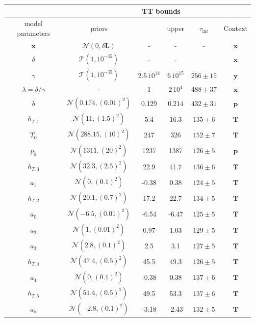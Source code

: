 \begin{table}
	\centering
	\begin{tabular}{ |c||c|c|c|c|c|   }
		\hline
		& &\multicolumn{2}{|c|}{TT bounds}& &\\
		\hline
		model parameters& priors&\makecell{lower}& \makecell{upper\\
		}&$\tau_{\text{int}}$&Context\\
		\hhline{|=||=|=|=|=|=|}
		$\bm{x}$ &$\mathcal{N}(0,\delta \bm{L})$ & -&-&-& $\bm{x}$\\ \hline
		$\delta$ &$\mathcal{T}(1,10^{-35})$ & -&-&  & $\bm{x}$\\ \hline
		$\gamma$ & $\mathcal{T}(1,10^{-35})$ &$2.5\,10^{14}$ &$6\,10^{15}$&  $ 256\pm 15$ &$\bm{y}$\\ \hline
		$\lambda  = \delta / \gamma$ &- & 1&$2\,10^{4}$& $488 \pm 37$ &$\bm{x}$\\ \hline
		$b$ &  $\mathcal{N}(0.174,(0.01)^2)$& 0.129& 0.214 &$432 \pm 31$&$\bm{p}$\\ \hline
		$h_{T,1}$ &  $\mathcal{N}(11,(1.5)^2)$&5.4 &16.3&$135 \pm 6$ &$\bm{T}$\\ \hline
		$T_{0}$ &  $\mathcal{N}(288.15,(10)^2)$& 247 &326&$152 \pm 7$&$\bm{T}$\\ \hline
		$p_0$ &  $\mathcal{N}(1311,(20)^2)$&1237 &1387&$126 \pm 5$&$\bm{p}$\\ \hline
		$h_{T,3}$ &  $\mathcal{N}(32.3,(2.5)^2)$&22.9&41.7&$136 \pm 6$&$\bm{T}$\\ \hline
		$a_{1}$ &  $\mathcal{N}(0,(0.1)^2)$&-0.38 &0.38&$124 \pm 5$&$\bm{T}$\\ \hline
		$h_{T,2}$ &  $\mathcal{N}(20.1,(0.7)^2)$&17.2 &22.7&$134 \pm 5$&$\bm{T}$\\ \hline
		$a_{0}$ &  $\mathcal{N}(-6.5,(0.01)^2)$&-6.54 &-6.47&$125 \pm 5$&$\bm{T}$\\ \hline
		$a_{2}$ &  $\mathcal{N}(1,(0.01)^2)$&0.97 &1.03&$129 \pm 5$&$\bm{T}$\\ \hline
		$a_{3}$ &  $\mathcal{N}(2.8,(0.1)^2)$&2.5 &3.1&$127\pm 5$&$\bm{T}$\\ \hline
		$h_{T,4}$ &  $\mathcal{N}(47.4,(0.5)^2)$&45.5 &49.3&$126 \pm 5$&$\bm{T}$\\ \hline
		$a_{4}$ &  $\mathcal{N}(0,(0.1)^2)$&-0.38 &0.38&$137 \pm 6$&$\bm{T}$\\ \hline
		$h_{T,5}$ &  $\mathcal{N}(51.4,(0.5)^2)$&49.5 &53.3&$137 \pm 6$&$\bm{T}$\\ \hline
		$a_{5}$ &  $\mathcal{N}(-2.8,(0.1)^2)$&-3.18 &-2.43&$132 \pm 5$&$\bm{T}$\\ \hline

\end{tabular}
\end{table}
